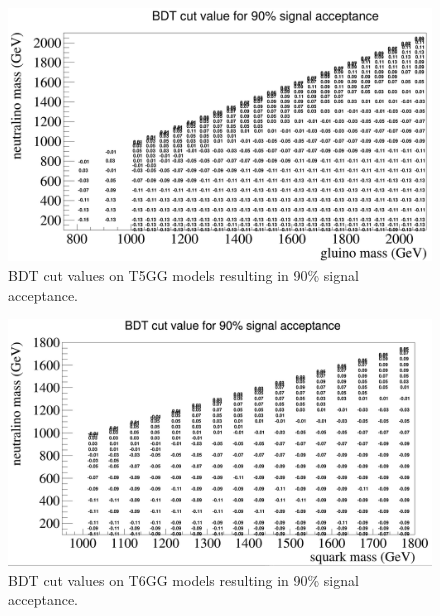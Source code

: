\begin{figure}[h]
	\centering
	\includegraphics[width=1.5\linewidth,angle=90]{Figures/T5Wg_bdtcuts}
	\caption[BDT cut values on T5GG models resulting in 90\% signal acceptance.]{BDT cut values on T5GG models resulting in 90\% signal acceptance.}
	\label{fig:t5wgbdtcuts}
\end{figure}
\begin{figure}[h]
	\centering
	\includegraphics[width=1.5\linewidth, angle=90]{Figures/T6Wg_bdtcuts}
	\caption[BDT cut values on T6GG models resulting in 90\% signal acceptance.]{BDT cut values on T6GG models resulting in 90\% signal acceptance.}
	\label{fig:t6wgbdtcuts}
\end{figure}

